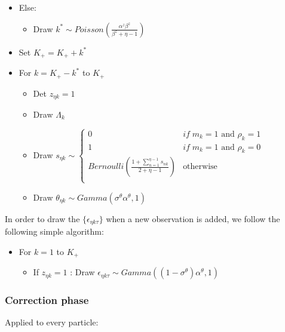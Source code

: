 \documentclass[12pt]{article}
\newcounter{thm}[section]
\begin{document}
\begin{itemize}
	\item Else:
	\begin{itemize}
		\item Draw $k^* \sim Poisson(\frac{\alpha^z \beta^z}{\beta^z + \eta - 1})$
	\end{itemize}
	\item Set $K_+ = K_+ + k^*$
	\item For $k=K_+ - k^*$ to $K_+$
	\begin{itemize}
		\item Det $z_{\eta k} = 1$
		\item Draw $\Lambda_k$
		\item Draw $s_{\eta k} \sim \left\{ \begin{array}{cl}
		0 & if \; m_k=1 \text{ and } \rho_k=1\\
		1 & if \; m_k=1 \text{ and } \rho_k=0\\
		Bernoulli(\frac{1 + \sum_{n=1}^{\eta-1} s_{nk}}{2+\eta-1}) & \text{otherwise}\\
		\end{array}\right.$
		\item Draw $\theta_{\eta k} \sim Gamma(\sigma^\theta \alpha^\theta,1)$
	\end{itemize}
\end{itemize} 

In order to draw the $\{\epsilon_{\eta k \tau}\}$ when a new observation is added, we follow the following simple algorithm:

\begin{itemize}
	\item For $k=1$ to $K_+$
	\begin{itemize}
		\item If $z_{\eta k}=1$ : Draw $\epsilon_{\eta k \tau} \sim Gamma((1-\sigma^\theta) \alpha^\theta,1)$
	\end{itemize}
\end{itemize} 	


\subsubsection{Correction phase}\label{sec:correction}

Applied to every particle:
\end{document}
